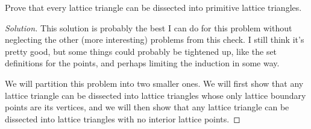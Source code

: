 \documentclass[12pt]{article}
\newenvironment{exercise}[2][Exercise]{\begin{trivlist}
        \item[\hskip \labelsep {\bfseries #1}\hskip \labelsep {\bfseries #2.}]}{\end{trivlist}}
\newenvironment{solution}
        {\begin{proof}[Solution]}
                    {\end{proof}}
\begin{document}
\begin{exercise}{45}
    Prove that every lattice triangle can be dissected into primitive lattice triangles.
    \begin{solution}
        This solution is probably the best I can do for this problem without neglecting the other (more interesting) problems from this check. I still think it's pretty good, but some things could probably be tightened up, like the set definitions for the points, and perhaps limiting the induction in some way.

        We will partition this problem into two smaller ones. We will first show that any lattice triangle can be dissected into lattice triangles whose only lattice boundary points are its vertices, and we will then show that any lattice triangle can be dissected into lattice triangles with no interior lattice points.


\end{solution}
\end{exercise}
\end{document}
